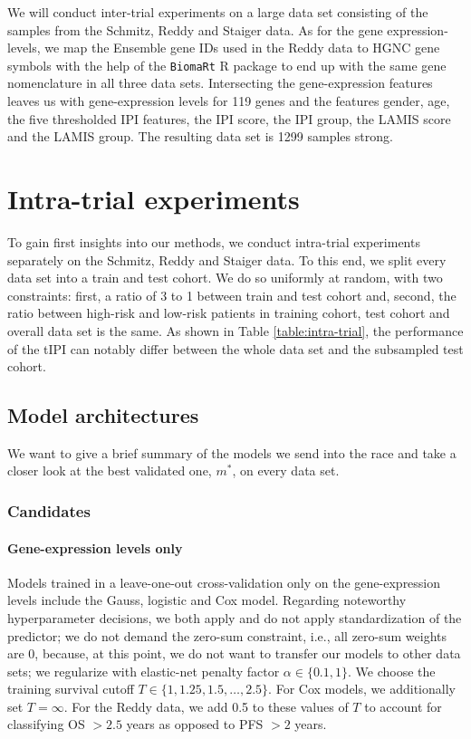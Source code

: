 We will conduct inter-trial experiments on a large data set consisting of the samples from the 
Schmitz, Reddy and Staiger data. As for the gene expression-levels, we map the Ensemble gene IDs 
used in the Reddy data to HGNC gene symbols with the help of the \texttt{BiomaRt} R package 
\cite{biomart09}
to end up with the same gene nomenclature in all three data sets. Intersecting the gene-expression 
features leaves us with gene-expression levels for \num{119} genes and the features gender, age, 
the five thresholded IPI features, the IPI score, the IPI group, the LAMIS score and the LAMIS 
group. The resulting data set is \num{1299} samples strong.

\section{Intra-trial experiments}\label{sec:intra-trial}

To gain first insights into our methods, we conduct intra-trial experiments separately on the 
Schmitz, Reddy and Staiger data. To this end, we split every data set into a train and test 
cohort. We do so uniformly at random, with two constraints: first, a ratio of 3 to 1 between train 
and test cohort and, second, the ratio between high-risk and low-risk patients in training cohort, 
test cohort and overall data set is the same. As shown in Table \ref{table:intra-trial}, the 
performance of the tIPI can notably differ between the whole data set and the subsampled test cohort. 



\subsection{Model architectures}

We want to give a brief summary of the models we send into the race and take a closer look at the 
best validated one, $m^*$, on every data set.

\subsubsection{Candidates}

\paragraph{Gene-expression levels only}
Models trained in a leave-one-out cross-validation only on the gene-expression levels include the 
Gauss, logistic and Cox model. Regarding noteworthy hyperparameter decisions, we both apply and 
do not apply standardization of the predictor; we do not demand the zero-sum constraint, i.e., all 
zero-sum weights are \num{0},
because, at this point, we do not want to transfer our models to other data sets;
we regularize with elastic-net penalty factor $\alpha \in \{ \num{0.1}, 1 \}$. We choose the 
training survival cutoff $T \in \{ 1, \num{1.25}, \num{1.5}, \ldots, \num{2.5}\}$. For Cox models, 
we additionally set $T = \infty$. For the Reddy data, we add \num{0.5} to these values of $T$ to 
account for classifying OS $> \num{2.5}$ years as opposed to PFS $> \num{2}$ years.

